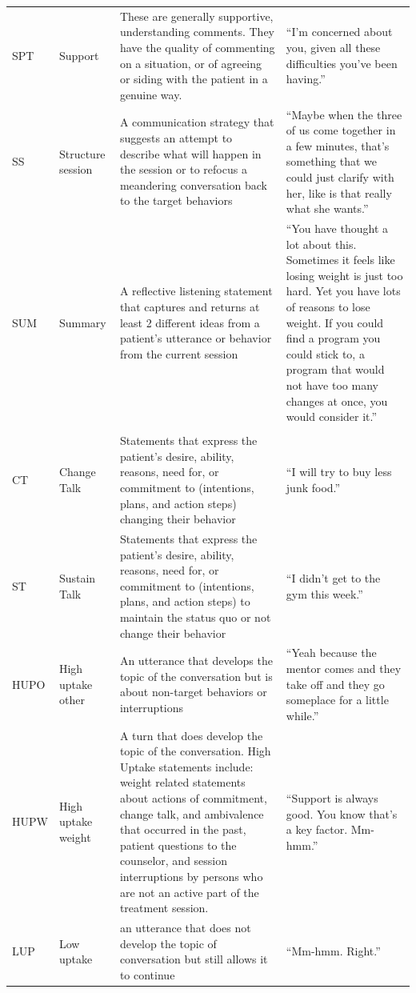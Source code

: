 \begin{small}
\begin{longtable}{p{1.3cm}p{2cm}p{5cm}p{4.8cm}}
SPT & Support & These are generally supportive, understanding comments. They have the quality of commenting on a situation, or of agreeing or siding with the patient in a genuine way. & ``I'm concerned about you, given all these difficulties you've been having.''\\
SS & Structure session & A communication strategy that suggests an attempt to describe what will happen in the session or to refocus a meandering conversation back to the target behaviors & ``Maybe when the three of us come together in a few minutes, that's something that we could just clarify with her, like is that really what she wants.''\\
SUM & Summary & A reflective listening statement that captures and returns at least 2 different ideas from a patient's utterance or behavior from the current session & ``You have thought a lot about this.  Sometimes it feels like losing weight is just too hard.  Yet you have lots of reasons to lose weight.  If you could find a program you could stick to, a program that would not have too many changes at once, you would consider it.''\\

\rowcolor{lightgraycol}
\noalign{\smallskip}
\multicolumn{4}{l}{\textbf{Patient}} \\
\noalign{\smallskip}
CT & Change Talk & Statements that express the patient's desire, ability, reasons, need for, or commitment to (intentions, plans, and action steps) changing their behavior & ``I will try to buy less junk food.''\\
ST & Sustain Talk & Statements that express the patient's desire, ability, reasons, need for, or commitment to (intentions, plans, and action steps) to maintain the status quo or not change their behavior  & ``I didn't get to the gym this week.''\\
HUPO	 & High uptake other & An utterance that develops the topic of the conversation but is about non-target behaviors or interruptions & ``Yeah because the mentor comes and they take off and they go someplace for a little while.''\\
HUPW & High uptake weight & A turn that does develop the topic of the conversation. High Uptake statements include: weight related statements about actions of commitment, change talk, and ambivalence that occurred in the past, patient questions to the counselor, and session interruptions by persons who are not an active part of the treatment session. & ``Support is always good.  You know that's a key factor.  Mm-hmm.''\\
LUP & Low uptake  & an utterance that does not develop the topic of conversation but still allows it to continue & ``Mm-hmm.  Right.''\\
\hline
\end{longtable}
\end{small}


